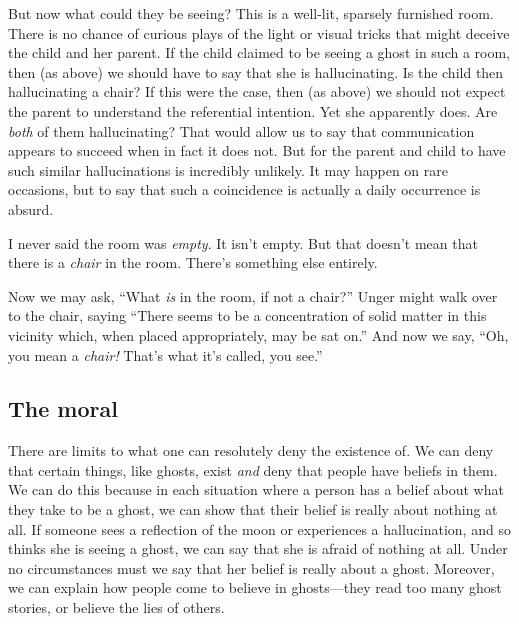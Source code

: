 \documentclass[11pt]{article}
\newcommand{\stage}[3]%
{%
	\begin{spacing}{1}%
	\vspace{0pt}
		\begin{description}[style=nextline, parsep=0pt, leftmargin=15mm, itemindent=-10mm, font=\mdseries]
			\item[\textsc{#1} \emph{#2}] #3
		\end{description}%
	\end{spacing}%
}
\begin{document}
\begin{spacing}{1.5}
But now what could they be seeing? This is a well-lit, sparsely furnished room. There is no chance of curious plays of the light or visual tricks that might deceive the child and her parent. If the child claimed to be seeing a ghost in such a room, then (as above) we should have to say that she is hallucinating. Is the child then hallucinating a chair? If this were the case, then (as above) we should not expect the parent to understand the referential intention. Yet she apparently does. Are {\em both} of them hallucinating? That would allow us to say that communication appears to succeed when in fact it does not. But for the parent and child to have such similar hallucinations is incredibly unlikely. It may happen on rare occasions, but to say that such a coincidence is actually a daily occurrence is absurd.

\stage{Peter Unger}{}{I never said the room was {\em empty}. It isn't empty. But that doesn't mean that there is a {\em chair} in the room. There's something else entirely.}

\noindent Now we may ask, ``What {\em is} in the room, if not a chair?'' Unger might walk over to the chair, saying ``There seems to be a concentration of solid matter in this vicinity which, when placed appropriately, may be sat on.'' And now we say, ``Oh, you mean a {\em chair!} That's what it's called, you see.''

\subsection{The moral}
There are limits to what one can resolutely deny the existence of. We can deny that certain things, like ghosts, exist {\em and} deny that people have beliefs in them. We can do this because in each situation where a person has a belief about what they take to be a ghost, we can show that their belief is really about nothing at all. If someone sees a reflection of the moon or experiences a hallucination, and so thinks she is seeing a ghost, we can say that she is afraid of nothing at all. Under no circumstances must we say that her belief is really about a ghost. Moreover, we can explain how people come to believe in ghosts---they read too many ghost stories, or believe the lies of others.


\end{spacing}
\end{document}
